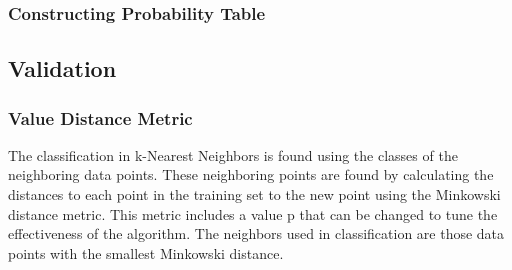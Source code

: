 \documentclass{article}
\begin{document}
		\subsubsection{Constructing Probability Table}
	\subsection{Validation}
		\subsubsection{Value Distance Metric}
			The classification in k-Nearest Neighbors is found using the classes of the neighboring data points.  These neighboring points are found by calculating the distances to each point in the training set to the new point using the Minkowski distance metric.  This metric includes a value p that can be changed to tune the effectiveness of the algorithm.  The neighbors used in classification are those data points with the smallest Minkowski distance.
\end{document}
